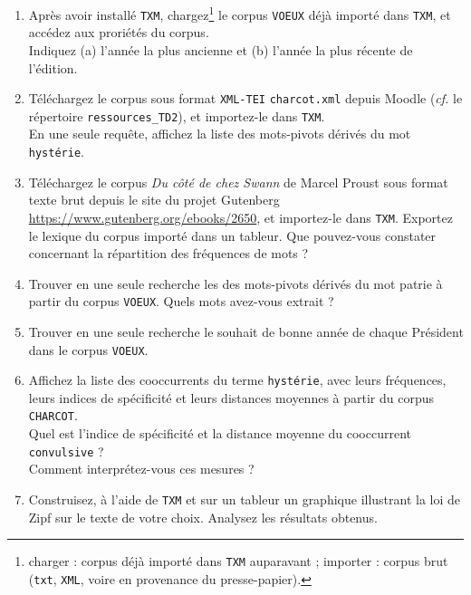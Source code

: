 \documentclass[xcolor={table,usenames,dvipsnames}]{article}
\begin{document}
	\begin{enumerate}
		\item Après avoir installé \texttt{TXM}, chargez\footnote{charger : corpus déjà importé dans \texttt{TXM} auparavant ; importer : corpus brut (\texttt{txt}, \texttt{XML}, voire en provenance du presse-papier).} le corpus \texttt{VOEUX} déjà importé dans \texttt{TXM}, et accédez aux proriétés du corpus. \\
		Indiquez (a) l'année la plus ancienne et (b) l'année la plus récente de l'édition.
		\item Téléchargez le corpus sous format \texttt{XML-TEI} \texttt{charcot.xml} depuis Moodle (\textit{cf.} le répertoire \texttt{ressources\_TD2}), et importez-le dans \texttt{TXM}.\\
		En une seule requête, affichez la liste des mots-pivots dérivés du mot \texttt{hystérie}.
		\item Téléchargez le corpus \textit{Du côté de chez Swann} de Marcel Proust sous format texte brut depuis le site du projet Gutenberg \url{https://www.gutenberg.org/ebooks/2650}, et importez-le dans \texttt{TXM}. Exportez le lexique du corpus importé dans un tableur. Que pouvez-vous constater concernant la répartition des fréquences de mots ?
		\item Trouver en une seule recherche les des mots-pivots dérivés du mot \og{}patrie\fg{} à partir du corpus \texttt{VOEUX}. Quels mots avez-vous extrait ?
		\item Trouver en une seule recherche le souhait de bonne année de chaque Président dans le corpus \texttt{VOEUX}.
		\item Affichez la liste des cooccurrents du terme \texttt{hystérie}, avec leurs fréquences, leurs indices de spécificité et leurs distances moyennes à partir du corpus \texttt{CHARCOT}.\\
		Quel est l'indice de spécificité et la distance moyenne du cooccurrent \texttt{convulsive} ?\\
		Comment interprétez-vous ces mesures ?
		\item Construisez, à l’aide de \texttt{TXM} et sur un tableur un graphique illustrant la loi de Zipf sur le texte de votre choix. Analysez les résultats obtenus.
	
	\end{enumerate}
	
	\bigskip
	
\end{document}

